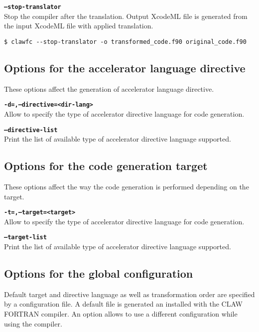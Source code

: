\documentclass{article}
\begin{document}
\textbf{\texttt{--stop-translator}}\\
Stop the compiler after the translation. Output XcodeML file is generated from the input XcodeML file with applied translation.
\begin{lstlisting}
$ clawfc --stop-translator -o transformed_code.f90 original_code.f90
\end{lstlisting}

\subsection{Options for the accelerator language directive}
These options affect the generation of accelerator language directive.

\textbf{\texttt{-d=,--directive=<dir-lang>}}\\
Allow to specify the type of accelerator directive language for code generation.

\textbf{\texttt{--directive-list}}\\
Print the list of available type of accelerator directive language supported.

\subsection{Options for the code generation target}
These options affect the way the code generation is performed depending on the target.

\textbf{\texttt{-t=,--target=<target>}}\\
Allow to specify the type of accelerator directive language for code generation.

\textbf{\texttt{--target-list}}\\
Print the list of available type of accelerator directive language supported.

\subsection{Options for the global configuration}
Default target and directive language as well as transformation order are
specified by a configuration file.
A default file is generated an installed with the CLAW FORTRAN compiler.
An option allows to use a different configuration while using the compiler.
\end{document}
